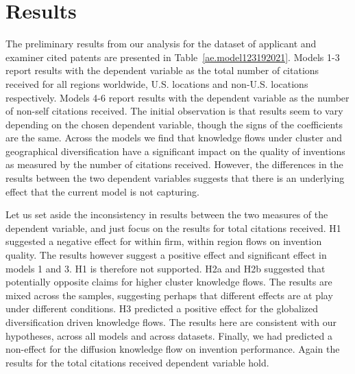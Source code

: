 \documentclass[12pt,letterpaper]{article}
\begin{document}
\section*{Results}
The preliminary results from our analysis for the dataset of applicant and examiner cited patents are presented in Table~\ref{ae.model123192021}. Models 1-3 report results with the dependent variable as the total number of citations received for all regions worldwide, U.S. locations and non-U.S. locations respectively. Models 4-6 report results with the dependent variable as the number of non-self citations received. The initial observation is that results seem to vary depending on the chosen dependent variable, though the signs of the coefficients are the same. Across the models we find that knowledge flows under cluster and geographical diversification have a significant impact on the quality of inventions as measured by the number of citations received. However, the differences in the results between the two dependent variables suggests that there is an underlying effect that the current model is not capturing. \par
Let us set aside the inconsistency in results between the two measures of the dependent variable, and just focus on the results for total citations received. H1 suggested a negative effect for within firm, within region flows on invention quality. The results however suggest a positive effect and significant effect in models 1 and 3. H1 is therefore not supported. H2a and H2b suggested that potentially opposite claims for higher cluster knowledge flows. The results are mixed across the samples, suggesting perhaps that different effects are at play under different conditions. H3 predicted a positive effect for the globalized diversification driven knowledge flows. The results here are consistent with our hypotheses, across all models and across datasets. Finally, we had predicted a non-effect for the diffusion knowledge flow on invention performance. Again the results for the total citations received dependent variable hold.  \par
\end{document}
